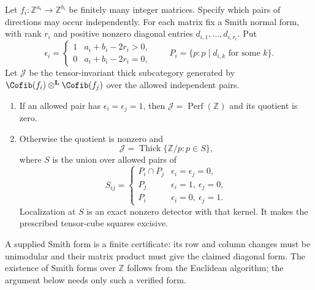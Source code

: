 \begin{theorem}\label{thm:matrix-collapse}
Let $f_i:\mathbb Z^{a_i}\to\mathbb Z^{b_i}$ be finitely many integer matrices. Specify which pairs of directions may occur independently. For each matrix fix a Smith normal form, with rank $r_i$ and positive nonzero diagonal entries $d_{i,1},\ldots,d_{i,r_i}$. Put
\[
 \epsilon_i=\begin{cases}
 1&a_i+b_i-2r_i>0,\\
 0&a_i+b_i-2r_i=0,
 \end{cases}
 \qquad
 P_i=\{p:p\mid d_{i,k}\text{ for some }k\}.
\]
Let $\mathcal J$ be the tensor-invariant thick subcategory generated by $\Cofib(f_i)\otimes^{\mathbf L}\Cofib(f_j)$ over the allowed independent pairs.
\begin{enumerate}
\item If an allowed pair has $\epsilon_i=\epsilon_j=1$, then $\mathcal J=\operatorname{Perf}(\mathbb Z)$ and its quotient is zero.
\item Otherwise the quotient is nonzero and
\[
 \mathcal J=\operatorname{Thick}\{\mathbb Z/p:p\in S\},
\]
where $S$ is the union over allowed pairs of
\[
 S_{ij}=\begin{cases}
 P_i\cap P_j&\epsilon_i=\epsilon_j=0,\\
 P_j&\epsilon_i=1,\ \epsilon_j=0,\\
 P_i&\epsilon_i=0,\ \epsilon_j=1.
 \end{cases}
\]
Localization at $S$ is an exact nonzero detector with that kernel. It makes the prescribed tensor-cube squares excisive.
\end{enumerate}
A supplied Smith form is a finite certificate: its row and column changes must be unimodular and their matrix product must give the claimed diagonal form. The existence of Smith forms over $\mathbb Z$ follows from the Euclidean algorithm; the argument below needs only such a verified form.
\end{theorem}

